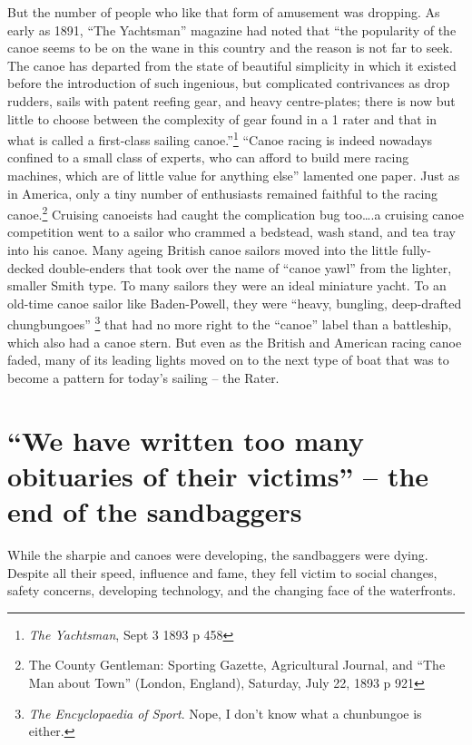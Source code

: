 \documentclass[
  letterpaper,
]{scrbook}
\begin{document}
But the number of people who like that form of amusement was dropping.
As early as 1891, ``The Yachtsman'' magazine had noted that ``the
popularity of the canoe seems to be on the wane in this country and the
reason is not far to seek. The canoe has departed from the state of
beautiful simplicity in which it existed before the introduction of such
ingenious, but complicated contrivances as drop rudders, sails with
patent reefing gear, and heavy centre-plates; there is now but little to
choose between the complexity of gear found in a 1 rater and that in
what is called a first-class sailing canoe.''\footnote{\emph{The
  Yachtsman}, Sept 3 1893 p 458} ``Canoe racing is indeed nowadays
confined to a small class of experts, who can afford to build mere
racing machines, which are of little value for anything else'' lamented
one paper. Just as in America, only a tiny number of enthusiasts
remained faithful to the racing canoe.\footnote{The County Gentleman:
  Sporting Gazette, Agricultural Journal, and ``The Man about Town''
  (London, England), Saturday, July 22, 1893 p 921} Cruising canoeists
had caught the complication bug too\ldots.a cruising canoe competition
went to a sailor who crammed a bedstead, wash stand, and tea tray into
his canoe. Many ageing British canoe sailors moved into the little
fully-decked double-enders that took over the name of ``canoe yawl''
from the lighter, smaller Smith type. To many sailors they were an ideal
miniature yacht. To an old-time canoe sailor like Baden-Powell, they
were ``heavy, bungling, deep-drafted chungbungoes'' \footnote{\emph{The
  Encyclopaedia of Sport}. Nope, I don't know what a chunbungoe is
  either.} that had no more right to the ``canoe'' label than a
battleship, which also had a canoe stern. But even as the British and
American racing canoe faded, many of its leading lights moved on to the
next type of boat that was to become a pattern for today's sailing --
the Rater.


\chapter{``We have written too many obituaries of their victims'' -- the
end of the sandbaggers}\label{sec-chapter8}

While the sharpie and canoes were developing, the sandbaggers were
dying. Despite all their speed, influence and fame, they fell victim to
social changes, safety concerns, developing technology, and the changing
face of the waterfronts.
\end{document}

